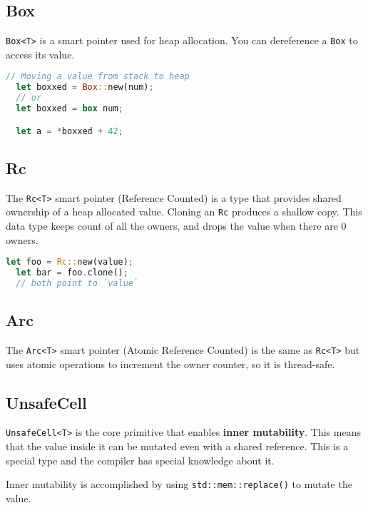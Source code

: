 \documentclass{article}
\begin{document}
\subsection{Box}

\texttt{Box<T>} is a smart pointer used for heap allocation.
You can dereference a \texttt{Box} to access its value.

\begin{lstlisting}[language=Rust, style=boxed, numbers=none]
  // Moving a value from stack to heap
  let boxxed = Box::new(num);
  // or
  let boxxed = box num;

  let a = *boxxed + 42;
\end{lstlisting}

\subsection{Rc}

The \texttt{Rc<T>} smart pointer (Reference Counted) is a type that provides
shared ownership of a heap allocated value. Cloning an \texttt{Rc} produces a shallow copy.
This data type keeps count of all the owners, and drops the value when there are 0 owners.

\begin{lstlisting}[language=Rust, style=boxed, numbers=none]
  let foo = Rc::new(value);
  let bar = foo.clone();
  // both point to `value`
\end{lstlisting}

\subsection{Arc}

The \texttt{Arc<T>} smart pointer (Atomic Reference Counted) is the same as \texttt{Rc<T>}
but uses atomic operations to increment the owner counter, so it is thread-safe.

\subsection{UnsafeCell}

\texttt{UnsafeCell<T>} is the core primitive that enables
\textbf{inner mutability}. This means that the value inside it can be
mutated even with a shared reference. This is a special type and the compiler
has special knowledge about it.

Inner mutability is accomplished by using \texttt{std::mem::replace()}
to mutate the value.
\end{document}
